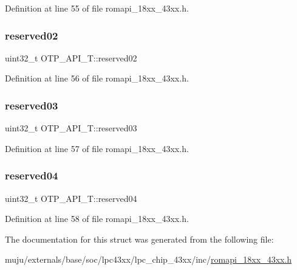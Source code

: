 Definition at line 55 of file romapi\+\_\+18xx\+\_\+43xx.\+h.

\mbox{\label{struct_o_t_p___a_p_i___t_a3e4f749ab03c9fd961c90e0741002e8d}} 
\subsubsection{\texorpdfstring{reserved02}{reserved02}}
{\footnotesize\ttfamily uint32\+\_\+t O\+T\+P\+\_\+\+A\+P\+I\+\_\+\+T\+::reserved02}



Definition at line 56 of file romapi\+\_\+18xx\+\_\+43xx.\+h.

\mbox{\label{struct_o_t_p___a_p_i___t_aaac0cb79bf1f4f7ee2d7099a893646ca}} 
\subsubsection{\texorpdfstring{reserved03}{reserved03}}
{\footnotesize\ttfamily uint32\+\_\+t O\+T\+P\+\_\+\+A\+P\+I\+\_\+\+T\+::reserved03}



Definition at line 57 of file romapi\+\_\+18xx\+\_\+43xx.\+h.

\mbox{\label{struct_o_t_p___a_p_i___t_a27a448718c0d46bd60f41d4fe9c77c17}} 
\subsubsection{\texorpdfstring{reserved04}{reserved04}}
{\footnotesize\ttfamily uint32\+\_\+t O\+T\+P\+\_\+\+A\+P\+I\+\_\+\+T\+::reserved04}



Definition at line 58 of file romapi\+\_\+18xx\+\_\+43xx.\+h.



The documentation for this struct was generated from the following file\+:\begin{DoxyCompactItemize}
\item 
muju/externals/base/soc/lpc43xx/lpc\+\_\+chip\+\_\+43xx/inc/\hyperlink{romapi__18xx__43xx_8h}{romapi\+\_\+18xx\+\_\+43xx.\+h}\end{DoxyCompactItemize}

